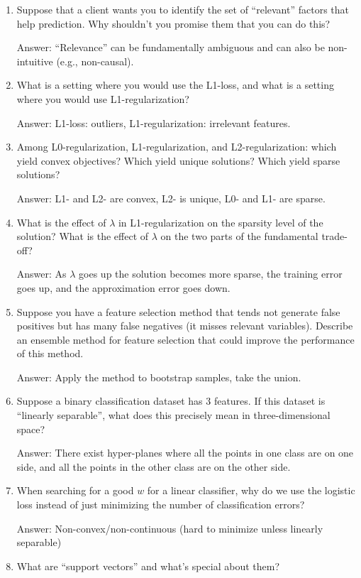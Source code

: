 \documentclass{article}
\def\ans#1{\par\gre{Answer: #1}}
\def\blu#1{{\color{blu}#1}}
\def\gre#1{{\color{gre}#1}}
\def\enum#1{\begin{enumerate}#1\end{enumerate}}
\begin{document}
\blu{
\enum{
\item Suppose that a client wants you to identify the set of ``relevant'' factors that help prediction. Why shouldn't you promise them that you can do this?
\ans{``Relevance'' can be fundamentally ambiguous and can also be non-intuitive (e.g., non-causal).}
\item What is a setting where you would use the L1-loss, and what is a setting where you would use L1-regularization?
\ans{L1-loss: outliers, L1-regularization: irrelevant features.}
\item Among L0-regularization, L1-regularization, and L2-regularization: which yield convex objectives? Which yield unique solutions? Which yield sparse solutions?
\ans{L1- and L2- are convex, L2- is unique, L0- and L1- are sparse.}
\item What is the effect of $\lambda$ in L1-regularization on the sparsity level of the solution? What is the effect of $\lambda$ on the two parts of the fundamental trade-off?
\ans{As $\lambda$ goes up the solution becomes more sparse, the training error goes up, and the approximation error goes down.}
\item Suppose you have a feature selection method that tends not generate false positives but has many false negatives (it misses relevant variables). Describe an ensemble method for feature selection that could improve the performance of this method.
\ans{Apply the method to bootstrap samples, take the union.}
\item Suppose a binary classification dataset has 3 features. If this dataset is ``linearly separable'', what does this precisely mean in three-dimensional space?
\ans{There exist hyper-planes where all the points in one class are on one side, and all the points in the other class are on the other side.}
\item When searching for a good $w$ for a linear classifier, why do we use the logistic loss instead of just minimizing the number of classification errors?
\ans{Non-convex/non-continuous (hard to minimize unless linearly separable)}
\item What are ``support vectors'' and what's special about them?
}}
\end{document}
